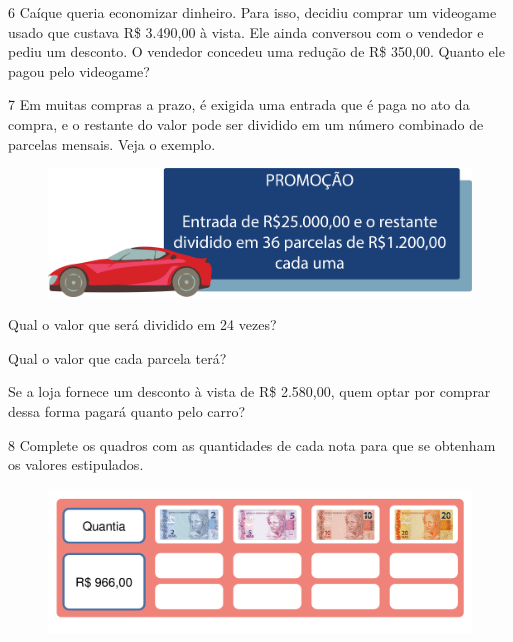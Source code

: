 \num{6} Caíque queria economizar  dinheiro. Para isso, decidiu comprar um videogame usado
que custava R\$ 3.490,00 à vista. Ele ainda conversou com o vendedor e pediu
um desconto. O vendedor concedeu  uma redução de R\$ 350,00. Quanto ele pagou pelo videogame?

\num{7} Em muitas compras a prazo, é exigida uma entrada que é paga no ato da
compra, e o restante do valor pode ser dividido em um número combinado de
parcelas mensais. Veja o exemplo.

\begin{figure}[htpb!]
\centering
\includegraphics[width=\textwidth]{./media/image68.png}
\end{figure}

\begin{escolha}
\item Qual o valor que será dividido em 24 vezes?

\item Qual o valor que cada parcela terá?

\item Se a loja fornece um desconto à vista de R\$ 2.580,00, quem optar por
  comprar dessa forma pagará quanto pelo carro?
\end{escolha}


\num{8}  Complete os quadros com as quantidades de cada nota para que se
obtenham os valores estipulados.

\begin{figure}[htpb!]
\centering
\includegraphics[width=\textwidth]{./media/image69.png}
\end{figure}

